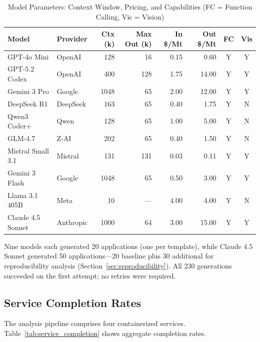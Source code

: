 \begin{table}[htbp]
    \centering
    \caption{Model Parameters: Context Window, Pricing, and Capabilities (FC = Function Calling, Vis = Vision)}
    \label{tab:model_params}
    \small
    \setlength{\tabcolsep}{4pt}
    \renewcommand{\arraystretch}{1.1}
    \begin{tabular}{@{} l l r r r r c c @{}}
        \toprule
        \textbf{Model} & \textbf{Provider} & \textbf{Ctx (k)} & \textbf{Max Out (k)} & \textbf{In \$/Mt} & \textbf{Out \$/Mt} & \textbf{FC} & \textbf{Vis} \\
        \midrule
        GPT-4o Mini & OpenAI & 128 & 16 & 0.15 & 0.60 & Y & Y \\
        GPT-5.2 Codex & OpenAI & 400 & 128 & 1.75 & 14.00 & Y & Y \\
        Gemini 3 Pro & Google & 1048 & 65 & 2.00 & 12.00 & Y & Y \\
        DeepSeek R1 & DeepSeek & 163 & 65 & 0.40 & 1.75 & Y & N \\
        Qwen3 Coder+ & Qwen & 128 & 65 & 1.00 & 5.00 & Y & N \\
        GLM-4.7 & Z-AI & 202 & 65 & 0.40 & 1.50 & Y & N \\
        Mistral Small 3.1 & Mistral & 131 & 131 & 0.03 & 0.11 & Y & Y \\
        Gemini 3 Flash & Google & 1048 & 65 & 0.50 & 3.00 & Y & Y \\
        Llama 3.1 405B & Meta & 10 & --- & 4.00 & 4.00 & Y & N \\
        Claude 4.5 Sonnet & Anthropic & 1000 & 64 & 3.00 & 15.00 & Y & Y \\
        \bottomrule
    \end{tabular}
\end{table}

Nine models each generated 20 applications (one per template), while Claude 4.5 Sonnet generated 50 applications---20 baseline plus 30 additional for reproducibility analysis (Section~\ref{sec:reproducibility}). All 230 generations succeeded on the first attempt; no retries were required.

\subsection{Service Completion Rates}

The analysis pipeline comprises four containerized services. Table~\ref{tab:service_completion} shows aggregate completion rates.

